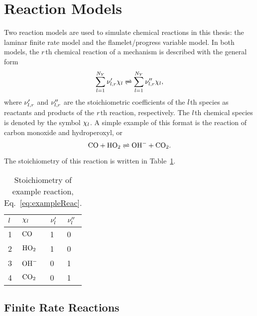 \section{Reaction Models}

Two reaction models are used to simulate chemical reactions in this thesis: the laminar finite rate model and the flamelet/progress variable model. In both models, the $r$th chemical reaction of a mechanism is described with the general form
%
\begin{equation}
	\specSumAll \stoichCoefSpecReac' \chi_{\specIdx} \xrightleftharpoons[]{} \specSumAll \stoichCoefSpecReac'' \chi_{\specIdx},
\end{equation}
%
where $\nu_{l,r}'$ and $\nu_{l,r}''$ are the stoichiometric coefficients of the $l$th species as reactants and products of the $r$th reaction, respectively. The $l$th chemical species is denoted by the symbol $\chi_{l}$. A simple example of this format is the reaction of carbon monoxide and hydroperoxyl, or
%
\begin{equation}\label{eq:exampleReac}
	\carbonmonox + \hydroperoxyl \xrightleftharpoons[]{} \hydroxide + \carbondiox.
\end{equation}
%
The stoichiometry of this reaction is written in Table~\ref{tab:exampleReac}.

\begin{table}
	\centering
	\setlength{\tabcolsep}{12pt}
	\begin{tabular}{llll}
		\toprule
		$l$ & $\chi_{l}$ & $\nu_{l}'$ & $\nu_{l}''$ \\
		\midrule
		1 & $\text{CO}$ & 1 & 0 \\
		2 & $\text{HO}_2$ & 1 & 0 \\
		3 & $\text{OH}^{-}$ & 0 & 1 \\
		4 & $\text{CO}_2$ & 0 & 1 \\
		\bottomrule
	\end{tabular}
	\caption{\label{tab:exampleReac}Stoichiometry of example reaction, Eq.~\ref{eq:exampleReac}.}
\end{table}

\subsection{Finite Rate Reactions}\label{sec:finiterate}

